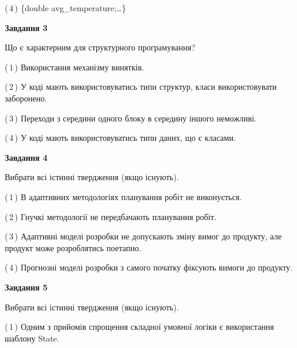 \documentclass[10pt, ukrainian]{article}
\begin{document}
{\begin {large}
(\,4\,) \{double avg\_temperature;…\} %


{\begin {center}\textbf{Завдання 3}\end {center}}\par
Що є характерним для структурного програмування?\par
\vspace{2mm}



(\,1\,) Використання механізму винятків. %



(\,2\,) У коді мають використовуватись типи структур, класи використовувати заборонено. %



(\,3\,) Переходи з середини одного блоку в середину іншого неможливі. %



(\,4\,) У коді мають використовуватись типи даних, що є класами. %


{\begin {center}\textbf{Завдання 4}\end {center}}\par
Вибрати всі істинні твердження (якщо існують).\par
\vspace{2mm}



(\,1\,) В адаптивних методологіях планування робіт не виконується. %



(\,2\,) Гнучкі методології не передбачають планування робіт. %



(\,3\,) Адаптивні моделі розробки не допускають зміну вимог до продукту, але продукт може розроблятись поетапно. %



(\,4\,) Прогнозні моделі розробки з самого початку фіксують вимоги до продукту. %


{\begin {center}\textbf{Завдання 5}\end {center}}\par
Вибрати всі істинні твердження (якщо існують).\par
\vspace{2mm}



(\,1\,) Одним з прийомів спрощення складної умовної логіки є використання шаблону State. %




\end{large}}
\end{document}
